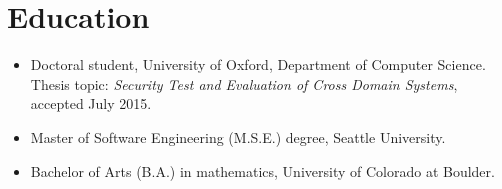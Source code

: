 \section*{Education}
\vspace{-2mm}

\begin{itemize}
	\item Doctoral student, University of Oxford, Department of
		Computer Science. Thesis topic: \emph{Security Test and
		Evaluation of Cross Domain Systems}, accepted July 2015.\vspace{-1mm}
	\item Master of Software Engineering (M.S.E.) degree, Seattle University.\vspace{-1mm}
	\item Bachelor of Arts (B.A.) in mathematics, University of Colorado at Boulder.
\end{itemize}


